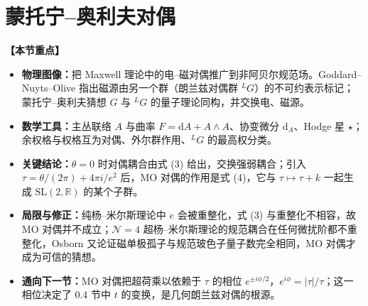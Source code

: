 \documentclass[11pt,a4paper,UTF8]{ctexart}
\newenvironment{keypoints}{%
  \par\addvspace{0.9em}%
  \noindent{\color{black!80}\rule{\linewidth}{0.6pt}}\par\nopagebreak\vspace{2pt}%
  \noindent\textbf{【本节重点】}\par\nopagebreak\vspace{2pt}%
  \begin{itemize}[leftmargin=1.6em,itemsep=1pt,topsep=2pt,parsep=0pt]%
}{%
  \end{itemize}\vspace{1pt}\noindent{\color{black!80}\rule{\linewidth}{0.6pt}}\par\addvspace{0.9em}%
}
\begin{document}


\section{蒙托宁–奥利夫对偶}

\begin{keypoints}
    \item \textbf{物理图像：}把 Maxwell 理论中的电–磁对偶推广到非阿贝尔规范场。Goddard–Nuyts–Olive 指出磁源由另一个群（朗兰兹对偶群 ${}^{L}G$）的不可约表示标记；蒙托宁–奥利夫猜想 $G$ 与 ${}^{L}G$ 的量子理论同构，并交换电、磁源。
    \item \textbf{数学工具：}主丛联络 $A$ 与曲率 $F=\mathrm{d}A+A\wedge A$、协变微分 $\mathrm{d}_{A}$、Hodge 星 $\star$；余权格与权格互为对偶、外尔群作用、${}^{L}G$ 的最高权分类。
    \item \textbf{关键结论：}$\theta=0$ 时对偶耦合由式 (3) 给出，交换强弱耦合；引入 $\tau=\theta/(2\pi)+4\pi i/e^{2}$ 后，MO 对偶的作用是式 (4)，它与 $\tau\mapsto\tau+k$ 一起生成 $\mathrm{SL}(2,\mathbb{R})$ 的某个子群。
    \item \textbf{局限与修正：}纯杨–米尔斯理论中 $e$ 会被重整化，式 (3) 与重整化不相容，故 MO 对偶并不成立；$\mathcal{N}=4$ 超杨–米尔斯理论的规范耦合在任何微扰阶都不重整化，Osborn 又论证磁单极孤子与规范玻色子量子数完全相同，MO 对偶才成为可信的猜想。
    \item \textbf{通向下一节：}MO 对偶把超荷乘以依赖于 $\tau$ 的相位 $e^{\pm i\phi/2}$，$e^{i\phi}=|\tau|/\tau$；这一相位决定了 0.4 节中 $t$ 的变换，是几何朗兰兹对偶的根源。
\end{keypoints}
\end{document}
